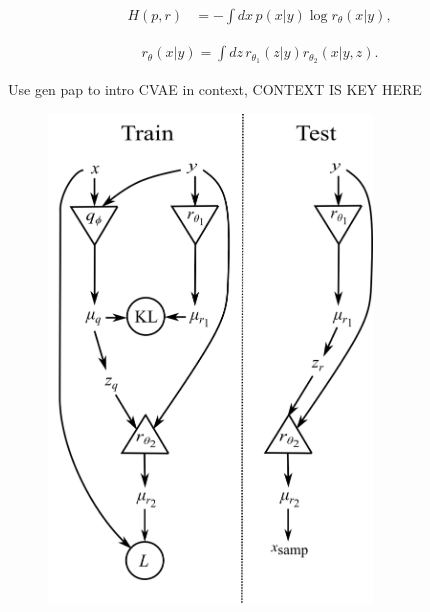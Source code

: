 \documentclass[aps,superscriptaddress,twocolumn,nopreprintnumbers,floatfix,groupedaddress]{revtex4-1}
\newcommand{\figwidth}{8.6cm}
\begin{document}
\begin{align}\label{eq:cross_ent} 
H(p,r) &= -\int dx\, p(x|y) \log r_{\theta}(x|y),
\end{align}

\begin{align}\label{eq:prop_post}
r_{\theta}(x|y) = \int dz\,r_{\theta_1}(z|y)r_{\theta_2}(x|y,z).
\end{align}


Use gen pap to intro CVAE in context, CONTEXT IS KEY HERE


\begin{figure}
	\centering
	\includegraphics[width=\figwidth]{figs/network_setup.png}
	\caption{}
	\label{fig:vit_flow}
\end{figure}

%
%
%
\end{document}
